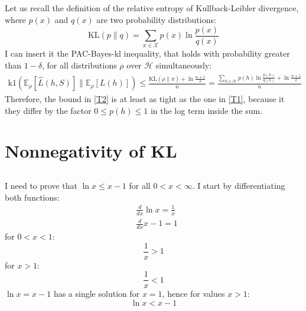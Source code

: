 \documentclass[a4paper]{article}
\begin{document}
\subsection{}
\label{subsec:32}
Let us recall the definition of the relative entropy of Kullback-Leibler
divergence, where $p(x)$ and $q(x)$ are two probability distributions:
\[
\mathrm{KL}(p \| q)=
\sum_{x \in \mathcal{X}} p(x) \ln \frac{p(x)}{q(x)}
\]
I can insert it the PAC-Bayes-kl inequality, that holds with probability greater
than $1-\delta$, for all distributions $\rho$ over $\mathcal{H}$ simultaneously:
\begin{align}
  \label{T2}
\mathrm{k} 1\left(\mathbb{E}_{\rho}[\hat{L}(h, S)] \|
\mathbb{E}_{\rho}[L(h)]\right)
\leq \frac{\mathrm{KL}(\rho \| \pi)+\ln \frac{n+1}{\delta}}{n}
=\frac{\sum_{h \in \mathcal{H}} p(h) \ln \frac{p(h)}{q(h)}+\ln \frac{n+1}{\delta}}{n}
\end{align}
Therefore, the bound in \ref{T2} is at least as tight as the one in \ref{T1},
because it they differ by the factor $0 \leq p(h) \leq 1$ in the log term inside
the sum.
\newpage

\section{Nonnegativity of KL}
\label{sec:4}
\subsection{}
\label{subsec:41}
I need to prove that $\ln x \leq x-1$ for all $0<x<\infty$. I start by
differentiating both functions:
\begin{align*}
&\frac{d}{dx}\ln x = \frac{1}{x} \\
&\frac{d}{dx}x-1 = 1 
\end{align*}
for $0 < x < 1:$
\[
\frac{1}{x} > 1
\]
for $x > 1:$
\[
\frac{1}{x} < 1 
\]
$\ln x = x-1$ has a single solution for $x=1$, hence for values $x>1$:
$$\ln x < x - 1$$
\end{document}
